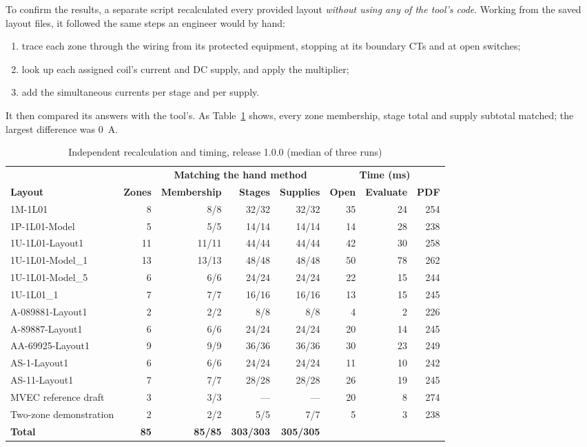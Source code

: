 To confirm the results, a separate script recalculated every provided layout
\emph{without using any of the tool's code}. Working from the saved layout files, it
followed the same steps an engineer would by hand:
\begin{enumerate}
  \item trace each zone through the wiring from its protected equipment, stopping at
        its boundary CTs and at open switches;
  \item look up each assigned coil's current and DC supply, and apply the multiplier;
  \item add the simultaneous currents per stage and per supply.
\end{enumerate}
It then compared its answers with the tool's. As Table~\ref{tab:validation} shows,
every zone membership, stage total and supply subtotal matched; the largest
difference was \SI{0}{A}.

\begin{table}[H]
  \centering
  \caption{Independent recalculation and timing, release 1.0.0 (median of three runs)}
  \label{tab:validation}
  \small
  \begin{tabular}{l r r r r r r r}
    \toprule
    & & \multicolumn{3}{c}{\textbf{Matching the hand method}} & \multicolumn{3}{c}{\textbf{Time (ms)}} \\
    \cmidrule(lr){3-5}\cmidrule(lr){6-8}
    \textbf{Layout} & \textbf{Zones} & \textbf{Membership} & \textbf{Stages} & \textbf{Supplies} & \textbf{Open} & \textbf{Evaluate} & \textbf{PDF} \\
    \midrule
    1M-1L01 & 8 & 8/8 & 32/32 & 32/32 & 35 & 24 & 254 \\
    1P-1L01-Model & 5 & 5/5 & 14/14 & 14/14 & 14 & 28 & 238 \\
    1U-1L01-Layout1 & 11 & 11/11 & 44/44 & 44/44 & 42 & 30 & 258 \\
    1U-1L01-Model\_1 & 13 & 13/13 & 48/48 & 48/48 & 50 & 78 & 262 \\
    1U-1L01-Model\_5 & 6 & 6/6 & 24/24 & 24/24 & 22 & 15 & 244 \\
    1U-1L01\_1 & 7 & 7/7 & 16/16 & 16/16 & 13 & 15 & 245 \\
    A-089881-Layout1 & 2 & 2/2 & 8/8 & 8/8 & 4 & 2 & 226 \\
    A-89887-Layout1 & 6 & 6/6 & 24/24 & 24/24 & 20 & 14 & 245 \\
    AA-69925-Layout1 & 9 & 9/9 & 36/36 & 36/36 & 30 & 23 & 249 \\
    AS-1-Layout1 & 6 & 6/6 & 24/24 & 24/24 & 11 & 10 & 242 \\
    AS-11-Layout1 & 7 & 7/7 & 28/28 & 28/28 & 26 & 19 & 245 \\
    MVEC reference draft & 3 & 3/3 & --- & --- & 20 & 8 & 274 \\
    Two-zone demonstration & 2 & 2/2 & 5/5 & 7/7 & 5 & 3 & 238 \\
    \midrule
    \textbf{Total} & \textbf{85} & \textbf{85/85} & \textbf{303/303} & \textbf{305/305} & & & \\
    \bottomrule
  \end{tabular}
\end{table}

